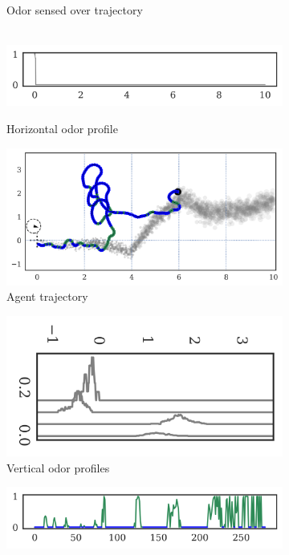 \documentclass[5p,twocolumn,authoryear]{elsarticle}
\begin{document}
\begin{figure}[h!]
\begin{subfigure}{0.40\textwidth}
    \caption{Odor sensed over trajectory} \\
    \includegraphics[width=\textwidth]{output_16_11.png}
    \caption{Horizontal odor profile}
\end{subfigure}%
\caption{Wind direction switches once}
\begin{subfigure}{0.38\textwidth}
    \centering
    \includegraphics[width=\textwidth]{output_16_15.png}
    \caption{Agent trajectory}
\end{subfigure}%
\begin{subfigure}{0.20\textwidth}
    \centering
    \includegraphics[width=\textwidth,angle=90,origin=c]{output_16_17.png}
    \caption{Vertical odor profiles}
\end{subfigure}%
\begin{subfigure}{0.40\textwidth}
    \includegraphics[width=\textwidth]{output_16_20.png} 

\end{subfigure}
\end{figure}
\end{document}
